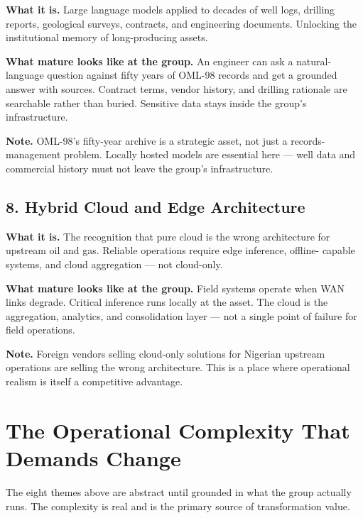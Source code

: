\documentclass[10pt]{article}
\newcommand{\spacer}{\vspace{10pt}}
\newcommand{\bigspacer}{\vspace{16pt}}
\begin{document}
\textbf{What it is.} Large language models applied to decades of well logs,
drilling reports, geological surveys, contracts, and engineering documents.
Unlocking the institutional memory of long-producing assets.

\textbf{What mature looks like at the group.} An engineer can ask a natural-
language question against fifty years of OML-98 records and get a grounded
answer with sources. Contract terms, vendor history, and drilling rationale
are searchable rather than buried. Sensitive data stays inside the group's
infrastructure.

\textbf{Note.} OML-98's fifty-year archive is a strategic asset, not just a
records-management problem. Locally hosted models are essential here ---
well data and commercial history must not leave the group's infrastructure.

\spacer

\subsection*{8. Hybrid Cloud and Edge Architecture}

\textbf{What it is.} The recognition that pure cloud is the wrong architecture
for upstream oil and gas. Reliable operations require edge inference, offline-
capable systems, and cloud aggregation --- not cloud-only.

\textbf{What mature looks like at the group.} Field systems operate when WAN
links degrade. Critical inference runs locally at the asset. The cloud is the
aggregation, analytics, and consolidation layer --- not a single point of
failure for field operations.

\textbf{Note.} Foreign vendors selling cloud-only solutions for Nigerian
upstream operations are selling the wrong architecture. This is a place where
operational realism is itself a competitive advantage.

\bigspacer

\section{The Operational Complexity That Demands Change}

The eight themes above are abstract until grounded in what the group actually
runs. The complexity is real and is the primary source of transformation value.
\end{document}
